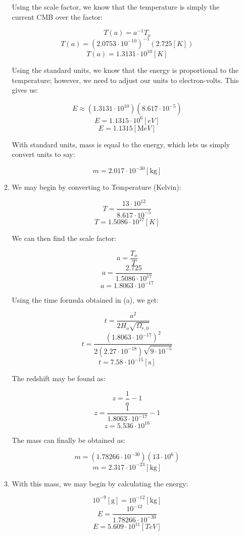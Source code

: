 \begin{enumerate}
\begin{enumerate}
        Using the scale factor, we know that the temperature is simply the current CMB over the factor:

        $$T(a)=a^{-1}T_o$$
        $$T(a)=\left( 2.0753\cdot10^{-10} \right)^{-1}(2.725[\si{K}])$$
        $$\boxed{T(a)=1.3131\cdot10^{10}[\si{K}]}$$

        Using the standard units, we know that the energy is proportional to the temperature; however, we need to adjust our units to electron-volts. This gives us:

        $$E\approx (1.3131\cdot10^{10})(8.617\cdot10^{-5})$$
        $$E=1.1315\cdot10^6[\si{eV}]$$
        $$\boxed{E=1.1315[\si{\mega eV}]}$$

        With standard units, mass is equal to the energy, which lets us simply convert units to say:

        $$\boxed{m=2.017\cdot10^{-30}\left[\si{\kilo\gram}\right]}$$

      \item We may begin by converting to Temperature (Kelvin):

        $$T=\frac{13\cdot10^{12}}{8.617\cdot10^{-5}}$$
        $$\boxed{T=1.5086\cdot10^{17}[\si{K}]}$$

        We can then find the scale factor:

        $$a=\frac{T_o}{T}$$
        $$a=\frac{2.725}{1.5086\cdot10^{17}}$$
        $$\boxed{a=1.8063\cdot10^{-17}}$$

        Using the time formula obtained in (a), we get:

        $$t=\frac{a^2}{2H_o\sqrt{\Omega_{r,0}}}$$
        $$t=\frac{(1.8063\cdot10^{-17})^2}{2(2.27\cdot10^{-18})\sqrt{9\cdot10^{-5}}}$$
        $$\boxed{t=7.58\cdot10^{-15}[\si{\second}]}$$

        The redshift may be found as:

        $$z=\frac{1}{a}-1$$
        $$z=\frac{1}{1.8063\cdot10^{-17}}-1$$
        $$\boxed{z=5.536\cdot10^{16}}$$

        The mass can finally be obtained as:

        $$m=\left( 1.78266\cdot10^{-30} \right)\left( 13\cdot10^{6} \right)$$
        $$\boxed{m=2.317\cdot10^{-23}[\si{\kilo\gram}]}$$

      \item With this mass, we may begin by calculating the energy:

        $$10^{-9}[\si{\gram}]=10^{-12}[\si{\kilo\gram}]$$
        $$E=\frac{10^{-12}}{1.78266\cdot10^{-30}}$$
        $$\boxed{E=5.609\cdot10^{11}[\si{TeV}]}$$


\end{enumerate}
\end{enumerate}
